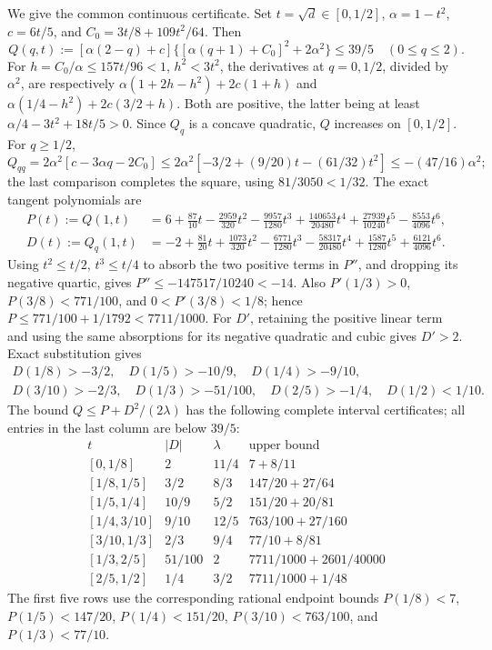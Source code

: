 We give the common continuous certificate. Set $t=\sqrt d\in[0,1/2]$,
$\alpha=1-t^2$, $c=6t/5$, and $C_0=3t/8+109t^2/64$. Then
\begin{equation}\tag{R08.2.1}\label{eq:R08:pointwise}
 Q(q,t):=[\alpha(2-q)+c]\{[\alpha(q+1)+C_0]^2+2\alpha^2\}
 \le39/5\quad(0\le q\le2).
\end{equation}
For $h=C_0/\alpha\le157t/96<1$, $h^2<3t^2$, the derivatives at
$q=0,1/2$, divided by $\alpha^2$, are respectively
$\alpha(1+2h-h^2)+2c(1+h)$ and
$\alpha(1/4-h^2)+2c(3/2+h)$. Both are positive, the latter being at
least $\alpha/4-3t^2+18t/5>0$. Since $Q_q$ is a concave quadratic,
$Q$ increases on $[0,1/2]$. For $q\ge1/2$,
\[
 Q_{qq}=2\alpha^2[c-3\alpha q-2C_0]
 \le2\alpha^2[-3/2+(9/20)t-(61/32)t^2]
 \le-(47/16)\alpha^2;
\]
the last comparison completes the square, using $81/3050<1/32$.
The exact tangent polynomials are
\begin{align*}
 P(t):=Q(1,t)&=6+\tfrac{87}{10}t-\tfrac{2959}{320}t^2
 -\tfrac{9957}{1280}t^3+\tfrac{140653}{20480}t^4
 +\tfrac{27939}{10240}t^5-\tfrac{8553}{4096}t^6,\\
 D(t):=Q_q(1,t)&=-2+\tfrac{81}{20}t+\tfrac{1073}{320}t^2
 -\tfrac{6771}{1280}t^3-\tfrac{58317}{20480}t^4
 +\tfrac{1587}{1280}t^5+\tfrac{6121}{4096}t^6.
\end{align*}
Using $t^2\le t/2$, $t^3\le t/4$ to absorb the two positive terms in
$P''$, and dropping its negative quartic, gives
$P''\le-147517/10240<-14$. Also $P'(1/3)>0$,
$P(3/8)<771/100$, and $0<P'(3/8)<1/8$; hence
$P\le771/100+1/1792<7711/1000$.
For $D'$, retaining the positive linear term and using the same
absorptions for its negative quadratic and cubic gives $D'>2$.
Exact substitution gives
\[
\begin{gathered}
D(1/8)>-3/2,\quad D(1/5)>-10/9,\quad D(1/4)>-9/10,\\
D(3/10)>-2/3,\quad D(1/3)>-51/100,\quad
D(2/5)>-1/4,\quad D(1/2)<1/10.
\end{gathered}
\]
The bound $Q\le P+D^2/(2\lambda)$ has the following complete
interval certificates; all entries in the last column are below $39/5$:
\[
\begin{array}{c|c|c|l}
t&|D|&\lambda&\text{upper bound}\\\hline
{}[0,1/8]&2&11/4&7+8/11\\
{}[1/8,1/5]&3/2&8/3&147/20+27/64\\
{}[1/5,1/4]&10/9&5/2&151/20+20/81\\
{}[1/4,3/10]&9/10&12/5&763/100+27/160\\
{}[3/10,1/3]&2/3&9/4&77/10+8/81\\
{}[1/3,2/5]&51/100&2&7711/1000+2601/40000\\
{}[2/5,1/2]&1/4&3/2&7711/1000+1/48
\end{array}
\]
The first five rows use the corresponding rational endpoint bounds
$P(1/8)<7$, $P(1/5)<147/20$, $P(1/4)<151/20$,
$P(3/10)<763/100$, and $P(1/3)<77/10$.

